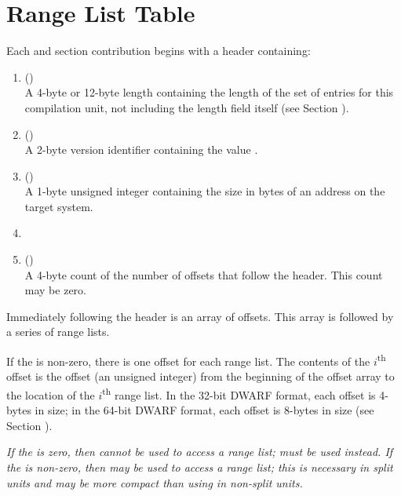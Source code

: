 \section{Range List Table}
\label{app:ranglisttable}
Each \dotdebugrnglists{} and \dotdebugrnglistsdwo{} section 
\bb
contribution
\eb
begins with a header containing:
\begin{enumerate}[1. ]
\item \HFNunitlength{} () \\
A 4-byte or 12-byte length containing the length of
the set of entries for this compilation unit, not
including the length field itself
\bb
(see Section ).
\eb

\item  \HFNversion{} (\HFTuhalf) \\
A 2-byte version identifier containing the value
\versiondotdebugrnglists{}. 

\item	\HFNaddresssize{} (\HFTubyte) \\
A 1-byte unsigned integer containing the size in
bytes of an address 
\db
on the target system.

\item	\HFNreservedwassegmentselectorsize{} 
\db
\\

\item   \HFNoffsetentrycount{} (\HFTuword) \\
A 4-byte count of the number of offsets
that follow the header. This count may be zero.
\end{enumerate}

Immediately following the header is an array of offsets.
This array is followed by a series of range lists. 

If the \HFNoffsetentrycount{} is non-zero, there 
is one offset for each range list. The contents
of the $i$\textsuperscript{th} offset is the offset 
(an unsigned integer) from the
beginning of the offset array to the location of the 
$i$\textsuperscript{th} range list.
In the 32-bit DWARF format, each offset is 4-bytes in size; 
in the 64-bit DWARF format, each offset is 8-bytes in size 
(see Section ).

\textit{If the \HFNoffsetentrycount{} is zero, then \DWFORMrnglistx{} cannot 
be used to access a range list; \DWFORMsecoffset{} must be used 
instead. If the \HFNoffsetentrycount{} is non-zero, then \DWFORMrnglistx{} 
may be used to access a range list; this is necessary in split units and
may be more compact than using \DWFORMsecoffset{} in non-split units.}

